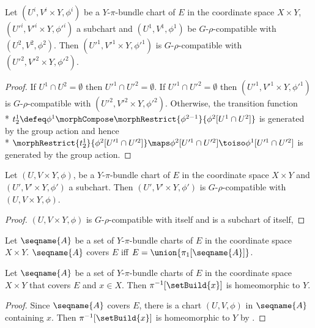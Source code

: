 \documentclass{article}
\begin{document}
\begin{lemma}
\label{lem:Grho-compatsub}
Let $(U^i, V^i \times Y, \phi^i)$ be a $Y$-$\pi$-bundle chart of $E$ in
the coordinate space $X \times Y$, $(U'^i, V'^i \times Y, \phi'^i)$ a
subchart and $(U^1, V^1, \phi^1)$ be $G$-$\rho$-compatible with
$(U^2, V^2, \phi^2)$.  Then $(U'^1, V'^1 \times Y, \phi'^1)$ is
$G$-$\rho$-compatible with $(U'^2, V'^2 \times Y, \phi'^2)$.

\begin{proof}
If $U^1 \cap U^2 = \emptyset$ then $U'^1 \cap U'^2 = \emptyset$. If
$U'^1 \cap U'^2 = \emptyset$ then
\nobreaks
{{
  $(U'^1, V'^1 \times Y, \phi'^1)$
}}
is $G$-$\rho$-compatible with $(U'^2, V'^2 \times Y, \phi'^2)$. Otherwise,
the transition function \\*
\nobreaks
{{
  $
    t^1_2 \defeq
    \phi^1 \morphCompose \morphRestrict{\phi^{2-1}}{\phi^2[U^1 \cap U^2]}
  $
}}
is generated by the group action and hence \\*
$
  \morphRestrict{t^1_2}{\phi^2[U'^1 \cap U'^2]}
  \maps
  \phi^2[U'^1 \cap U'^2]
  \toiso
  \phi^1[U'^1 \cap U'^2]
$
is generated by the group action.
\end{proof}
\end{lemma}

\begin{corollary}
Let $(U, V \times Y, \phi)$, be a $Y$-$\pi$-bundle chart of $E$ in the
coordinate space $X \times Y$ and $(U', V' \times Y, \phi')$ a subchart.
Then $(U', V' \times Y, \phi')$ is $G$-$\rho$-compatible with
$(U, V \times Y, \phi)$.

\begin{proof}
$(U, V \times Y, \phi)$ is $G$-$\rho$-compatible with itself and is a
subchart of itself,
\end{proof}
\end{corollary}

\begin{definition}
Let $\seqname{A}$ be a set of $Y$-$\pi$-bundle
charts of $E$ in the coordinate space $X \times Y$.
$\seqname{A}$ covers $E$ iff $E = \union{{\pi_1[\seqname{A}]}}$.
\end{definition}

\begin{lemma}
Let $\seqname{A}$ be a set of $Y$-$\pi$-bundle charts of $E$ in the
coordinate space $X \times Y$ that covers $E$ and $x \in X$. Then
$\pi^{-1}[\setBuild{x}]$ is homeomorphic to $Y$.
\begin{proof}
Since $\seqname{A}$ covers $E$, there is a chart $(U, V, \phi)$ in
$\seqname{A}$ containing $x$.
Then $\pi^{-1}[\setBuild{x}]$ is homeomorphic to $Y$ by
.
\end{proof}
\end{lemma}
\end{document}

